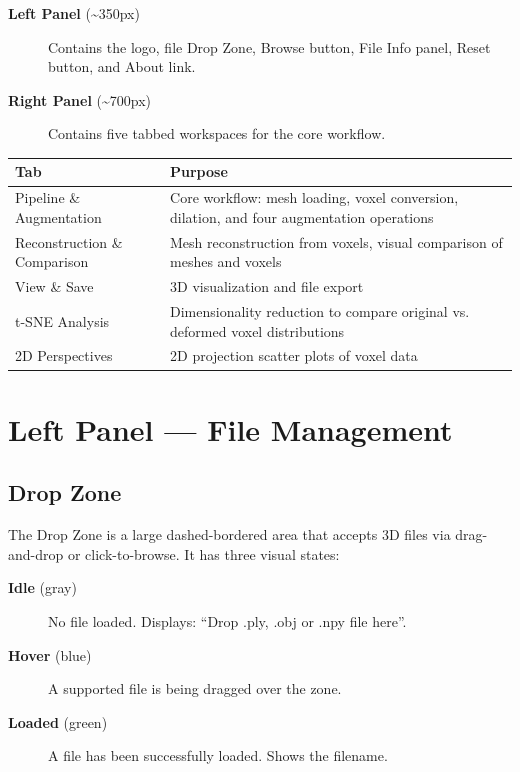\documentclass[12pt,a4paper]{article}
\begin{document}
\begin{description}
  \item[\textbf{Left Panel} (\~{}350px)] Contains the logo, file Drop Zone, Browse button, File Info panel, Reset button, and About link.
  \item[\textbf{Right Panel} (\~{}700px)] Contains five tabbed workspaces for the core workflow.
\end{description}

\begin{table}[H]
\centering
\begin{tabular}{lp{10cm}}
\toprule
\textbf{Tab} & \textbf{Purpose} \\
\midrule
Pipeline \& Augmentation & Core workflow: mesh loading, voxel conversion, dilation, and four augmentation operations \\
Reconstruction \& Comparison & Mesh reconstruction from voxels, visual comparison of meshes and voxels \\
View \& Save & 3D visualization and file export \\
t-SNE Analysis & Dimensionality reduction to compare original vs. deformed voxel distributions \\
2D Perspectives & 2D projection scatter plots of voxel data \\
\bottomrule
\end{tabular}
\end{table}

\section{Left Panel --- File Management}

\subsection{Drop Zone}

The Drop Zone is a large dashed-bordered area that accepts 3D files via drag-and-drop or click-to-browse. It has three visual states:

\begin{description}
  \item[\textbf{Idle} (gray)] No file loaded. Displays: ``Drop .ply, .obj or .npy file here''.
  \item[\textbf{Hover} (blue)] A supported file is being dragged over the zone.
  \item[\textbf{Loaded} (green)] A file has been successfully loaded. Shows the filename.
\end{description}
\end{document}
